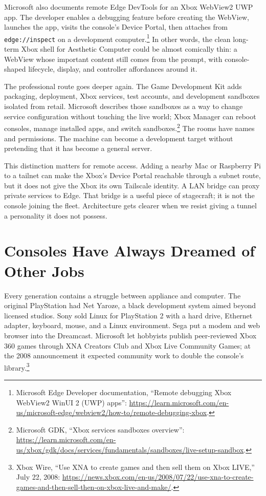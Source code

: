 \documentclass[11pt,letterpaper]{article}
\begin{document}
Microsoft also documents remote Edge DevTools for an Xbox WebView2 UWP app. The developer enables a debugging feature before creating the WebView, launches the app, visits the console's Device Portal, then attaches from \texttt{edge://inspect} on a development computer.\footnote{Microsoft Edge Developer documentation, ``Remote debugging Xbox WebView2 WinUI 2 (UWP) apps'': \url{https://learn.microsoft.com/en-us/microsoft-edge/webview2/how-to/remote-debugging-xbox}.} In other words, the clean long-term Xbox shell for Aesthetic Computer could be almost comically thin: a WebView whose important content still comes from the prompt, with console-shaped lifecycle, display, and controller affordances around it.

The professional route goes deeper again. The Game Development Kit adds packaging, deployment, Xbox services, test accounts, and development sandboxes isolated from retail. Microsoft describes those sandboxes as a way to change service configuration without touching the live world; Xbox Manager can reboot consoles, manage installed apps, and switch sandboxes.\footnote{Microsoft GDK, ``Xbox services sandboxes overview'': \url{https://learn.microsoft.com/en-us/xbox/gdk/docs/services/fundamentals/sandboxes/live-setup-sandbox}.} The rooms have names and permissions. The machine can become a development target without pretending that it has become a general server.

This distinction matters for remote access. Adding a nearby Mac or Raspberry Pi to a tailnet can make the Xbox's Device Portal reachable through a subnet route, but it does not give the Xbox its own Tailscale identity. A LAN bridge can proxy private services to Edge. That bridge is a useful piece of stagecraft; it is not the console joining the fleet. Architecture gets clearer when we resist giving a tunnel a personality it does not possess.

\section{Consoles Have Always Dreamed of Other Jobs}

Every generation contains a struggle between appliance and computer. The original PlayStation had Net Yaroze, a black development system aimed beyond licensed studios. Sony sold Linux for PlayStation 2 with a hard drive, Ethernet adapter, keyboard, mouse, and a Linux environment. Sega put a modem and web browser into the Dreamcast. Microsoft let hobbyists publish peer-reviewed Xbox 360 games through XNA Creators Club and Xbox Live Community Games; at the 2008 announcement it expected community work to double the console's library.\footnote{Xbox Wire, ``Use XNA to create games and then sell them on Xbox LIVE,'' July 22, 2008: \url{https://news.xbox.com/en-us/2008/07/22/use-xna-to-create-games-and-then-sell-then-on-xbox-live-and-make/}.}
\end{document}
